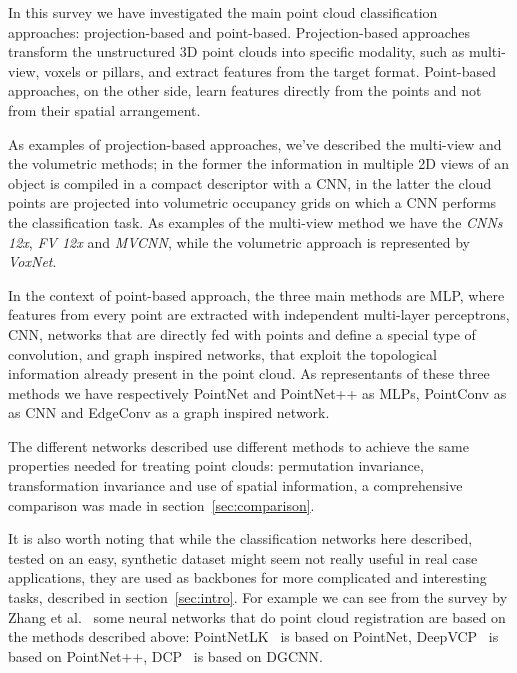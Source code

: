 In this survey we have investigated the main point cloud classification approaches: projection-based and point-based. Projection-based approaches transform the unstructured 3D point clouds into specific modality, such as multi-view, voxels or pillars, and extract features from the target format. Point-based approaches, on the other side, learn features directly from the points and not from their spatial arrangement.

As examples of projection-based approaches, we've described the multi-view and the volumetric methods; in the former the information in multiple 2D views of an object is compiled in a compact descriptor with a CNN, in the latter the cloud points are projected into volumetric occupancy grids on which a CNN performs the classification task. As examples of the multi-view method we have the \textit{CNNs 12x}, \textit{FV 12x} and \textit{MVCNN}, while the volumetric approach is represented by \textit{VoxNet}.

In the context of point-based approach, the three main methods are MLP, where features from every point are extracted with independent multi-layer perceptrons, CNN, networks that are directly fed with points and define a special type of convolution, and graph inspired networks, that exploit the topological information already present in the point cloud. As representants of these three methods we have respectively PointNet and PointNet++ as MLPs, PointConv as as CNN and EdgeConv as a graph inspired network.

The different networks described use different methods to achieve the same properties needed for treating point clouds: permutation invariance, transformation invariance and use of spatial information, a comprehensive comparison was made in section~\ref{sec:comparison}.

It is also worth noting that while the classification networks here described, tested on an easy, synthetic dataset might seem not really useful in real case applications, they are used as backbones for more complicated and interesting tasks, described in section~\ref{sec:intro}.
For example we can see from the survey by Zhang et al.~\cite{ZHANG2020222} some neural networks that do point cloud registration are based on the methods described above: PointNetLK~\cite{pointnetlk} is based on PointNet, DeepVCP~\cite{deepvcp} is based on PointNet++, DCP~\cite{dcp} is based on DGCNN.


